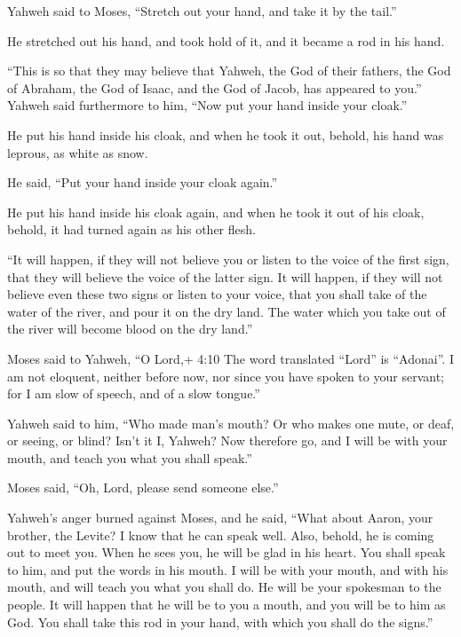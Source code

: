  Yahweh said to Moses, ``Stretch out your hand, and take it
by the tail.''

He stretched out his hand, and took hold of it, and it became a rod in
his hand.

 ``This is so that they may believe that Yahweh, the God of
their fathers, the God of Abraham, the God of Isaac, and the God of
Jacob, has appeared to you.''  Yahweh said furthermore to
him, ``Now put your hand inside your cloak.''

He put his hand inside his cloak, and when he took it out, behold, his
hand was leprous, as white as snow.

 He said, ``Put your hand inside your cloak again.''

He put his hand inside his cloak again, and when he took it out of his
cloak, behold, it had turned again as his other flesh.

 ``It will happen, if they will not believe you or listen to
the voice of the first sign, that they will believe the voice of the
latter sign.  It will happen, if they will not believe even
these two signs or listen to your voice, that you shall take of the
water of the river, and pour it on the dry land. The water which you
take out of the river will become blood on the dry land.''

 Moses said to Yahweh, ``O Lord,+ 4:10 The word translated
``Lord'' is ``Adonai''. I am not eloquent, neither before now, nor since
you have spoken to your servant; for I am slow of speech, and of a slow
tongue.''

 Yahweh said to him, ``Who made man's mouth? Or who makes
one mute, or deaf, or seeing, or blind? Isn't it I, Yahweh?
 Now therefore go, and I will be with your mouth, and teach
you what you shall speak.''

 Moses said, ``Oh, Lord, please send someone else.''

 Yahweh's anger burned against Moses, and he said, ``What
about Aaron, your brother, the Levite? I know that he can speak well.
Also, behold, he is coming out to meet you. When he sees you, he will be
glad in his heart.  You shall speak to him, and put the
words in his mouth. I will be with your mouth, and with his mouth, and
will teach you what you shall do.  He will be your
spokesman to the people. It will happen that he will be to you a mouth,
and you will be to him as God.  You shall take this rod in
your hand, with which you shall do the signs.''

